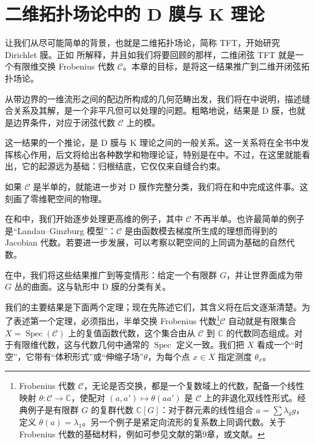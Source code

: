 \chapter{二维拓扑场论中的 D 膜与 K 理论}\label{chap:2}

让我们从尽可能简单的背景，也就是二维拓扑场论，简称 TFT，开始研究 Dirichlet 膜。正如  所解释，并且如我们将要回顾的那样，二维闭弦 TFT 就是一个有限维交换 Frobenius 代数 $\mathcal{C}$。本章的目标，是将这一结果推广到二维开闭弦拓扑场论。

从带边界的一维流形之间的配边所构成的几何范畴出发，我们将在中说明，描述缝合关系及其解，是一个非平凡但可以处理的问题。粗略地说，结果是 D 膜，也就是边界条件，对应于闭弦代数 $\mathcal{C}$ 上的模。

这一结果的一个推论，是 D 膜与 K 理论之间的一般关系。这一关系将在全书中发挥核心作用，后文将给出各种数学和物理论证，特别是在中。不过，在这里就能看出，它的起源远为基础：归根结底，它仅仅来自缝合约束。

如果 $\mathcal{C}$ 是半单的，就能进一步对 D 膜作完整分类，我们将在和中完成这件事。这刻画了零维靶空间的物理。

在和中，我们开始逐步处理更高维的例子，其中 $\mathcal{C}$ 不再半单。也许最简单的例子是“Landau--Ginzburg 模型”：$\mathcal{C}$ 是由函数模去梯度所生成的理想而得到的 Jacobian 代数。若要进一步发展，可以考察以靶空间的上同调为基础的自然代数。

在中，我们将这些结果推广到等变情形：给定一个有限群 $G$，并让世界面成为带 $G$ 丛的曲面。这与轨形中 D 膜的分类有关。

\label{sec:2.0.1}

我们的主要结果是下面两个定理；现在先陈述它们，其含义将在后文逐渐清楚。为了表述第一个定理，必须指出，半单交换 Frobenius 代数\footnote{Frobenius 代数 $\mathcal{C}$，无论是否交换，都是一个复数域上的代数，配备一个线性映射 $\theta\colon\mathcal{C}\to\mathbb{C}$，使配对 $(a,a')\mapsto\theta(aa')$ 是 $\mathcal{C}$ 上的非退化双线性形式。经典例子是有限群 $G$ 的复群代数 $\mathbb{C}[G]$：对于群元素的线性组合 $a=\sum\lambda_g g$，定义 $\theta(a)=\lambda_1$。另一个例子是紧定向流形的复系数上同调代数。关于 Frobenius 代数的基础材料，例如可参见文献的第9章，或文献。}$\mathcal{C}$ 自动就是有限集合 $X=\operatorname{Spec}(\mathcal{C})$ 上的复值函数代数，这个集合由从 $\mathcal{C}$ 到 $\mathbb{C}$ 的代数同态组成。对于有限维代数，这与代数几何中通常的 $\operatorname{Spec}$ 定义一致。我们把 $X$ 看成一个“时空”，它带有“体积形式”或“伸缩子场”$\theta$，为每个点 $x\in X$ 指定测度 $\theta_x$。

